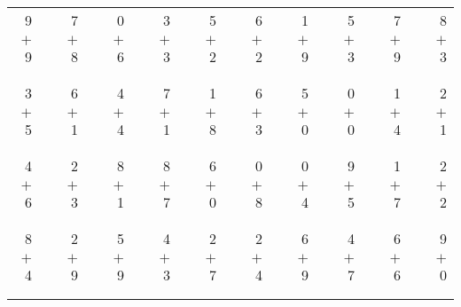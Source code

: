 \documentclass[12pt, letterpaper]{article}
\begin{document}
\begin{tabular}{rrrrrrrrrrrrrrrrrrr}
9 & & 7 & & 0 & & 3 & & 5 & & 6 & & 1 & & 5 & & 7 & & 8\\
$+$ 9 & & $+$ 8 & & $+$ 6 & & $+$ 3 & & $+$ 2 & & $+$ 2 & & $+$ 9 & & $+$ 3 & & $+$ 9 & & $+$ 3\\
\cline{1-1} \cline{3-3} \cline{5-5} \cline{7-7} \cline{9-9} \cline{11-11} \cline{13-13} \cline{15-15} \cline{17-17} \cline{19-19} \\ \\
3 & & 6 & & 4 & & 7 & & 1 & & 6 & & 5 & & 0 & & 1 & & 2\\
$+$ 5 & & $+$ 1 & & $+$ 4 & & $+$ 1 & & $+$ 8 & & $+$ 3 & & $+$ 0 & & $+$ 0 & & $+$ 4 & & $+$ 1\\
\cline{1-1} \cline{3-3} \cline{5-5} \cline{7-7} \cline{9-9} \cline{11-11} \cline{13-13} \cline{15-15} \cline{17-17} \cline{19-19} \\ \\
4 & & 2 & & 8 & & 8 & & 6 & & 0 & & 0 & & 9 & & 1 & & 2\\
$+$ 6 & & $+$ 3 & & $+$ 1 & & $+$ 7 & & $+$ 0 & & $+$ 8 & & $+$ 4 & & $+$ 5 & & $+$ 7 & & $+$ 2\\
\cline{1-1} \cline{3-3} \cline{5-5} \cline{7-7} \cline{9-9} \cline{11-11} \cline{13-13} \cline{15-15} \cline{17-17} \cline{19-19} \\ \\
8 & & 2 & & 5 & & 4 & & 2 & & 2 & & 6 & & 4 & & 6 & & 9\\
$+$ 4 & & $+$ 9 & & $+$ 9 & & $+$ 3 & & $+$ 7 & & $+$ 4 & & $+$ 9 & & $+$ 7 & & $+$ 6 & & $+$ 0\\
\cline{1-1} \cline{3-3} \cline{5-5} \cline{7-7} \cline{9-9} \cline{11-11} \cline{13-13} \cline{15-15} \cline{17-17} \cline{19-19} \\ \\
\end{tabular}
\newpage
\end{document}
